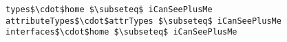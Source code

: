 \lstset{frame=tb, aboveskip=12pt, belowskip=-3pt, breaklines=true, basicstyle=\small\ttfamily, tabsize=2, mathescape=true}
\begin{lstlisting}[caption={facts.als, lines 234-236}, label=alloy:ELEMENT_VISIBILITY, captionpos=b]
types$\cdot$home $\subseteq$ iCanSeePlusMe
attributeTypes$\cdot$attrTypes $\subseteq$ iCanSeePlusMe
interfaces$\cdot$home $\subseteq$ iCanSeePlusMe
\end{lstlisting}